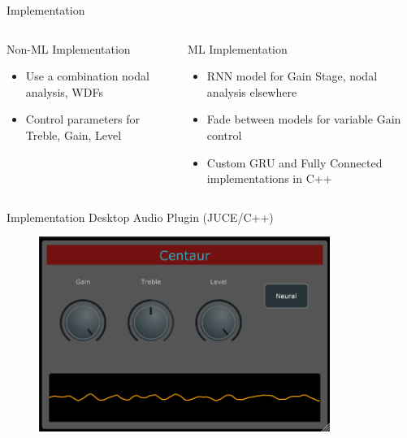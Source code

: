 \begin{frame}{Implementation}
    \begin{columns}
        \begin{column}{0.5\linewidth}
            Non-ML Implementation
            \begin{itemize}
                \item Use a combination nodal analysis, WDFs
                \item Control parameters for Treble, Gain, Level
            \end{itemize}
        \end{column}
        \begin{column}{0.5\linewidth}
            ML Implementation
            \begin{itemize}
                \item RNN model for Gain Stage, nodal analysis elsewhere
                \item Fade between models for variable Gain control
                \item Custom GRU and Fully Connected implementations in C++
            \end{itemize}
        \end{column}
    \end{columns}
\end{frame}

\begin{frame}{Implementation}
    Desktop Audio Plugin (JUCE/C++)
    \begin{figure}
        \centering
        \includegraphics[height=2.5in]{../Paper/Figures/Plugin.png}
    \end{figure}
\end{frame}

